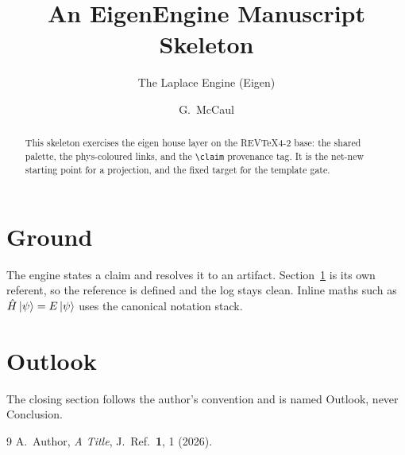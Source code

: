 \documentclass[reprint,aps,prx,superscriptaddress,nofootinbib]{revtex4-2}
\begin{document}
\title{An EigenEngine Manuscript Skeleton}
\author{The Laplace Engine (Eigen)}
\author{G.\ McCaul}

\begin{abstract}
This skeleton exercises the eigen house layer on the REVTeX4-2 base: the shared
palette, the phys-coloured links, and the \verb|\claim| provenance tag. It is the
net-new starting point for a projection, and the fixed target for the template gate.
\end{abstract}

\maketitle

\section{Ground}\label{sec:ground}
The engine states a claim and resolves it to an artifact. Section~\ref{sec:ground}
is its own referent, so the reference is defined and the log stays clean. Inline maths
such as $\hat{H}\ket{\psi} = E\ket{\psi}$ uses the canonical notation stack.

\section{Outlook}\label{sec:outlook}
The closing section follows the author's convention and is named Outlook, never
Conclusion.

\begin{thebibliography}{9}
 A.\ Author, \emph{A Title}, J.\ Ref.\ \textbf{1}, 1 (2026).
\end{thebibliography}
\end{document}
